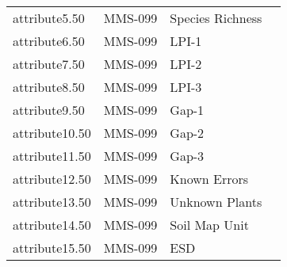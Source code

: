 \documentclass[
]{article}
\begin{document}
\begin{longtable}[]{@{}llll@{}}
attribute5.50 & MMS-099 & Species Richness & \\
attribute6.50 & MMS-099 & LPI-1 & \\
attribute7.50 & MMS-099 & LPI-2 & \\
attribute8.50 & MMS-099 & LPI-3 & \\
attribute9.50 & MMS-099 & Gap-1 & \\
attribute10.50 & MMS-099 & Gap-2 & \\
attribute11.50 & MMS-099 & Gap-3 & \\
attribute12.50 & MMS-099 & Known Errors & \\
attribute13.50 & MMS-099 & Unknown Plants & \\
attribute14.50 & MMS-099 & Soil Map Unit & \\
attribute15.50 & MMS-099 & ESD & \\
\bottomrule
\end{longtable}
\end{document}
